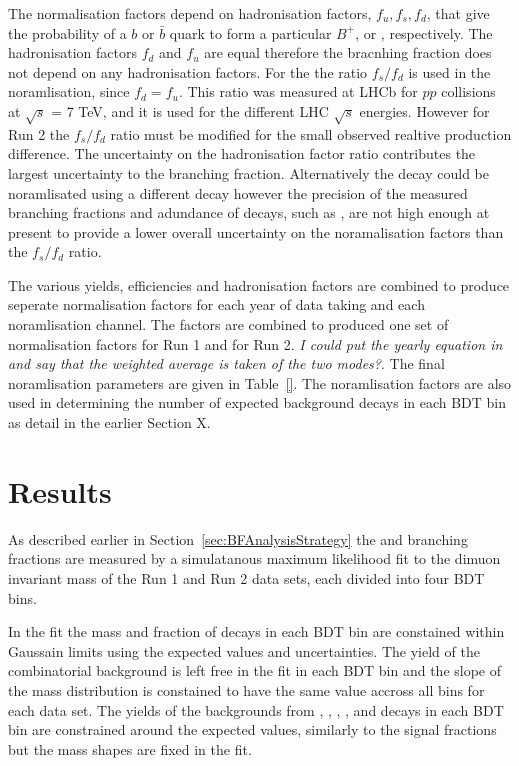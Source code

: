 The normalisation factors depend on hadronisation factors, $f_{u}, f_{s}, f_{d}$, that give the probability of a $b$ or $\bar{b}$ quark to form a particular $B^{+}$, \bs or \bd, respectively. The hadronisation factors $f_{d}$ and $f_{u}$ are equal therefore the \bdmumu bracnhing fraction does not depend on any hadronisation factors. For the \bsmumu the ratio $f_{s}/f_{d}$ is used in the noramlisation, since $f_{d} = f_{u}$. This ratio was measured at LHCb for $pp$ collisions at $\sqrt{s}$ = 7 TeV, and it is used for the different LHC $\sqrt{s}$ energies. However for Run 2 the $f_{s}/f_{d}$ ratio must be modified for the small observed realtive production difference. 
The uncertainty on the hadronisation factor ratio contributes the largest uncertainty to the \bsmumu branching fraction. Alternatively the \bsmumu decay could be noramlisated using a different \bs decay however the precision of the measured branching fractions and adundance of \bs decays, such as \bsjpsiphi, are not high enough at present to provide a lower overall uncertainty on the noramalisation factors than the $f_{s}/f_{d}$ ratio.


The various yields, efficiencies and hadronisation factors are combined to produce seperate normalisation factors for each year of data taking and each noramlisation channel. The factors are combined to produced one set of normalisation factors for Run 1 and for Run 2.  {\it I could put the yearly equation in and say that the weighted average is taken of the two modes?}. The final noramlisation parameters are given in Table~\ref{}. The \bujpsik noramlisation factors are also used in determining the number of expected background decays in each BDT bin as detail in the earlier Section X. 


\section{Results}
\label{sec:BFResults}

As described earlier in Section~\ref{sec:BFAnalysisStrategy} the \bsmumu and \bmumu branching fractions are measured by a simulatanous maximum likelihood fit to the dimuon invariant mass of the Run 1 and Run 2 data sets, each divided into four BDT bins. 

In the fit the mass \pdfs and fraction of \bmumu decays in each BDT bin are constained within Gaussain limits using the expected values and uncertainties. The yield of the combinatorial background is left free in the fit in each BDT bin and the slope of the mass distribution is constained to have the same value accross all bins for each data set. The yields of the backgrounds from \bhh, \bdpimunu, \bsKmunu, \bpimumu, \bdpimumu and \bcjpsimunu decays in each BDT bin are constrained around the expected values, similarly to the signal fractions but the mass shapes are fixed in the fit.

